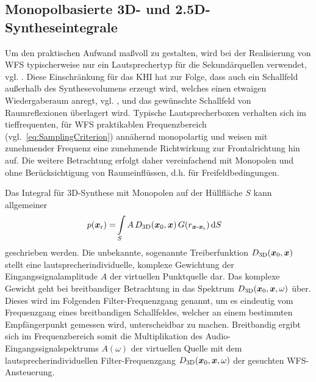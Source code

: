 \subsection{Monopolbasierte 3D- und 2.5D-Syntheseintegrale}
%
Um den praktischen Aufwand maßvoll zu gestalten, wird bei der Realisierung von WFS
typischerweise nur ein Lautsprechertyp für die Sekundärquellen verwendet,
vgl. \cite{Vries1996_JAES}.
%
Diese Einschränkung für das KHI hat zur Folge,
dass auch ein Schallfeld außerhalb des Synthesevolumens
erzeugt wird, welches einen etwaigen Wiedergaberaum anregt,
vgl. \cite{Start1997_diss, Wittek2007_JAES, Wittek2007_diss, Gauthier2007_Acta,Erbes2020_diss},
und das gewünschte Schallfeld von Raumreflexionen überlagert wird.
%
Typische Lautsprecherboxen verhalten sich im tieffrequenten, für WFS praktikablen
Frequenzbereich (vgl.~\Glg\eqref{eq:SamplingCriterion})
annähernd monopolartig und weisen mit zunehmender Frequenz
eine zunehmende Richtwirkung zur Frontalrichtung hin auf.
%
Die weitere Betrachtung erfolgt daher vereinfachend mit Monopolen und
ohne Berücksichtigung von Raumeinflüssen, d.h. für Freifeldbedingungen.



Das Integral für 3D-Synthese mit Monopolen auf der Hüllfläche $S$
kann allgemeiner
\begin{align}
p(\bm{x}_\mathrm{r}) =& \int\limits_S A \, D_\text{3D}(\bm{x}_\mathrm{0},\bm{x}) \, G(r_{\bm{x}\text{-}\bm{x}_\mathrm{r}}) \, \mathrm{d}S
\label{eq:MonopolIntegral_3D}
\end{align}
geschrieben werden.
Die unbekannte, sogenannte Treiberfunktion $D_\text{3D}(\bm{x}_\mathrm{0},\bm{x})$
stellt eine lautsprecherindividuelle, komplexe Gewichtung der
Eingangssignalamplitude $A$ der virtuellen Punktquelle dar.
%
Das komplexe Gewicht geht bei breitbandiger Betrachtung in das Spektrum
$D_\text{3D}(\bm{x}_\mathrm{0},\bm{x},\omega)$ über.
Dieses wird im Folgenden Filter-Frequenzgang genannt, um es eindeutig
vom Frequenzgang eines breitbandigen Schallfeldes, welcher an einem
bestimmten Empfängerpunkt gemessen wird, unterscheidbar zu machen.
%
Breitbandig ergibt sich im Frequenzbereich somit die Multiplikation des
Audio-Eingangssignalspektrums $A(\omega)$ der virtuellen Quelle
mit dem lautsprecherindividuellen Filter-Frequenzgang
$D_\text{3D}(\bm{x}_\mathrm{0},\bm{x},\omega)$ der gesuchten WFS-Ansteuerung.



